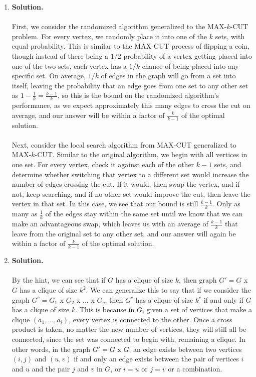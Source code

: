 \documentclass[11pt]{article}
\newcommand\solution{%
  \textbf{Solution.}\\%
}
\begin{document}
\begin{enumerate}
\item

\solution \\
First, we consider the randomized algorithm generalized to the MAX-$k$-CUT problem. For every vertex, we randomly place it into one of the $k$ sets, with equal probability. This is similar to the MAX-CUT process of flipping a coin, though instead of there being a $1/2$ probability of a vertex getting placed into one of the two sets, each vertex has a $1/k$ chance of being placed into any specific set. On average, $1/k$ of edges in the graph will go from a set into itself, leaving the probability that an edge goes from one set to any other set as $1 - \frac{1}{k} = \frac{k-1}{k}$, so this is the bound on the randomized algorithm's performance, as we expect approximately this many edges to cross the cut on average, and our answer will be within a factor of $\frac{k}{k-1}$ of the optimal solution. \\
\\
Next, consider the local search algorithm from MAX-CUT generalized to MAX-$k$-CUT. Similar to the original algorithm, we begin with all vertices in one set. For every vertex, check it against each of the other $k-1$ sets, and determine whether switching that vertex to a different set would increase the number of edges crossing the cut. If it would, then swap the vertex, and if not, keep searching, and if no other set would improve the cut, then leave the vertex in that set. In this case, we see that our bound is still $\frac{k-1}{k}$. Only as many as $\frac{1}{k}$ of the edges stay within the same set until we know that we can make an advantageous swap, which leaves us with an average of $\frac{k-1}{k}$ that leave from the original set to any other set, and our answer will again be within a factor of $\frac{k}{k-1}$ of the optimal solution. 

\item 

\solution \\
By the hint, we can see that if $G$ has a clique of size $k$, then graph $G' = G$ x $G$ has a clique of size $k^2$. We can generalize this to say that if we consider the graph $G^c = G_1$ x $G_2$ x ... x $G_c$, then $G^c$ has a clique of size $k^c$ if and only if $G$ has a clique of size $k$. This is because in $G$, given a set of vertices that make a clique $(a_1, ..., a_i)$, every vertex is connected to the other. Once a cross product is taken, no matter the new number of vertices, they will still all be connected, since the set was connected to begin with, remaining a clique. In other words, in the graph $G' = G$ x $G$, an edge exists between two vertices $(i,j)$ and $(u,v)$ if and only an edge exists between the pair of vertices $i$ and $u$ and the pair $j$ and $v$ in $G$, or $i = u$ or $j = v$ or a combination. 


\end{enumerate}
\end{document}
